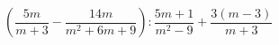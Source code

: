 \begin{ex}[type=expression]
	\begin{condition}
		\(\left( \dfrac{5m}{m+3}-\dfrac{14m}{m^2+6m+9} \right):\dfrac{5m+1}{m^2-9}+\dfrac{3(m-3)}{m+3}\)
	\end{condition}
\end{ex}
